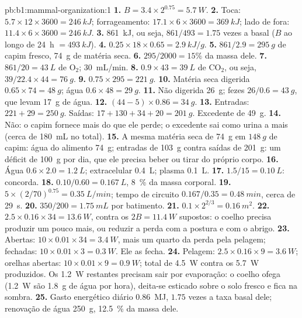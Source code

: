 \begin{solution}{pb:b1:mammal-organization:1}
\textbf{1.} $B = 3.4\times 2^{0.75} = \qty{5.7}{W}$.
\textbf{2.} Toca: $5.7\times 12\times 3600 = \qty{246}{kJ}$;
forrageamento: $17.1\times 6\times 3600 = \qty{369}{kJ}$; lado de fora:
$11.4\times 6\times 3600 = \qty{246}{kJ}$.
\textbf{3.} \qty{861}{kJ}, ou seja, $861/493 = 1.75$ vezes a basal ($B$
ao longo de \qty{24}{h} $= \qty{493}{kJ}$).
\textbf{4.} $0.25\times 18\times 0.65 = \qty{2.9}{kJ/g}$.
\textbf{5.} $861/2.9 = \qty{295}{g}$ de capim fresco, \qty{74}{g} de
matéria seca.
\textbf{6.} $295/2000 = 15\%$ da massa dele.
\textbf{7.} $861/20 = \qty{43}{L}$ de $\mathrm{O_2}$; \qty{30}{mL/min}.
\textbf{8.} $0.9\times 43 = \qty{39}{L}$ de $\mathrm{CO_2}$, ou seja, $39/22.4\times 44 = \qty{76}{g}$.
\textbf{9.} $0.75\times 295 = \qty{221}{g}$.
\textbf{10.} Matéria seca digerida $0.65\times 74 = \qty{48}{g}$; água
$0.6\times 48 = \qty{29}{g}$.
\textbf{11.} Não digerida \qty{26}{g}; fezes $26/0.6 = \qty{43}{g}$,
que levam \qty{17}{g} de água.
\textbf{12.} $(44 - 5)\times 0.86 = \qty{34}{g}$.
\textbf{13.} Entradas: $221 + 29 = \qty{250}{g}$. Saídas: $17 + 130 + 34 + 20
= \qty{201}{g}$. Excedente de \qty{49}{g}.
\textbf{14.} Não: o capim fornece mais do que ele perde; o excedente sai
como urina a mais (cerca de \qty{180}{mL} no total).
\textbf{15.} A mesma matéria seca de \qty{74}{g} em $\qty{148}{g}$ de
capim: água do alimento \qty{74}{g}; entradas de \qty{103}{g} contra
saídas de \qty{201}{g}: um déficit de \qty{100}{g} por dia, que ele
precisa beber ou tirar do próprio corpo.
\textbf{16.} Água $0.6\times 2.0 = \qty{1.2}{L}$; extracelular
\qty{0.4}{L}; plasma \qty{0.1}{L}.
\textbf{17.} $1.5/15 = \qty{0.10}{L}$: concorda.
\textbf{18.} $0.10/0.60 = \qty{0.167}{L}$, \qty{8}{\%} da massa
corporal.
\textbf{19.} $5\times(2/70)^{0.75} = \qty{0.35}{L/min}$; tempo de
circuito $0.167/0.35 = \qty{0.48}{min}$, cerca de \qty{29}{s}.
\textbf{20.} $350/200 = \qty{1.75}{mL}$ por batimento.
\textbf{21.} $0.1\times 2^{2/3} = \qty{0.16}{m^2}$.
\textbf{22.} $2.5\times 0.16\times 34 = \qty{13.6}{W}$, contra os
$2B = \qty{11.4}{W}$ supostos: o coelho precisa produzir um pouco mais,
ou reduzir a perda com a postura e com o abrigo.
\textbf{23.} Abertas: $10\times 0.01\times 34 = \qty{3.4}{W}$, mais um
quarto da perda pela pelagem; fechadas: $10\times 0.01\times 3 =
\qty{0.3}{W}$. Ele as fecha.
\textbf{24.} Pelagem: $2.5\times 0.16\times 9 = \qty{3.6}{W}$; orelhas
abertas: $10\times 0.01\times 9 = \qty{0.9}{W}$; total de \qty{4.5}{W}
contra os \qty{5.7}{W} produzidos. Os \qty{1.2}{W} restantes precisam
sair por evaporação: o coelho ofega (\qty{1.2}{W} são \qty{1.8}{g} de
água por hora), deita-se esticado sobre o solo fresco e fica na sombra.
\textbf{25.} Gasto energético diário \qty{0.86}{MJ}, $1.75$ vezes a taxa
basal dele; renovação de água \qty{250}{g}, \qty{12.5}{\%} da massa
dele.
\end{solution}
